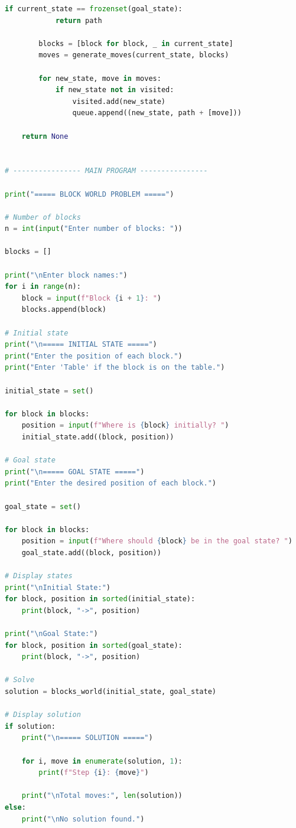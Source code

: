 \documentclass[11pt,a4paper]{report}
\begin{document}
\begin{lstlisting}[language=Python]
        if current_state == frozenset(goal_state):
            return path

        blocks = [block for block, _ in current_state]
        moves = generate_moves(current_state, blocks)

        for new_state, move in moves:
            if new_state not in visited:
                visited.add(new_state)
                queue.append((new_state, path + [move]))

    return None


# ---------------- MAIN PROGRAM ----------------

print("===== BLOCK WORLD PROBLEM =====")

# Number of blocks
n = int(input("Enter number of blocks: "))

blocks = []

print("\nEnter block names:")
for i in range(n):
    block = input(f"Block {i + 1}: ")
    blocks.append(block)

# Initial state
print("\n===== INITIAL STATE =====")
print("Enter the position of each block.")
print("Enter 'Table' if the block is on the table.")

initial_state = set()

for block in blocks:
    position = input(f"Where is {block} initially? ")
    initial_state.add((block, position))

# Goal state
print("\n===== GOAL STATE =====")
print("Enter the desired position of each block.")

goal_state = set()

for block in blocks:
    position = input(f"Where should {block} be in the goal state? ")
    goal_state.add((block, position))

# Display states
print("\nInitial State:")
for block, position in sorted(initial_state):
    print(block, "->", position)

print("\nGoal State:")
for block, position in sorted(goal_state):
    print(block, "->", position)

# Solve
solution = blocks_world(initial_state, goal_state)

# Display solution
if solution:
    print("\n===== SOLUTION =====")

    for i, move in enumerate(solution, 1):
        print(f"Step {i}: {move}")

    print("\nTotal moves:", len(solution))
else:
    print("\nNo solution found.")
\end{lstlisting}
\end{document}
